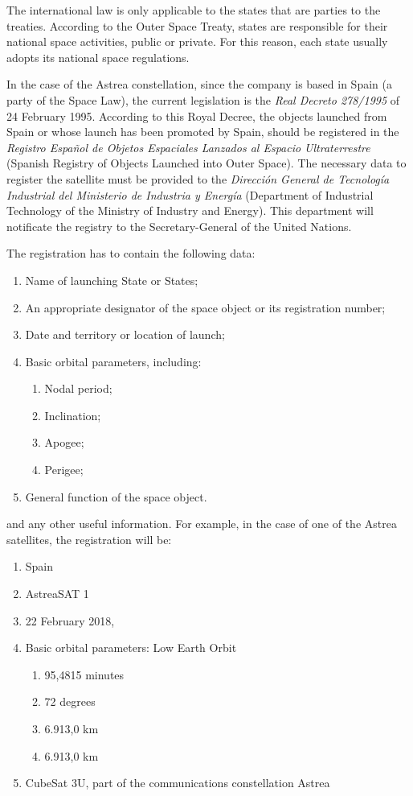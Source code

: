 The international law is only applicable to the states that are parties to the treaties. According to the Outer Space Treaty, states are responsible for their national space activities, public or private. For this reason, each state usually adopts its national space regulations.

In the case of the Astrea constellation, since the company is based in Spain (a party of the Space Law), the current legislation is the \textit{Real Decreto 278/1995} of 24 February 1995. According to this Royal Decree, the objects launched from Spain or whose launch has been promoted by Spain, should be registered in the \textit{Registro Español de Objetos Espaciales Lanzados al Espacio Ultraterrestre} (Spanish Registry of Objects Launched into Outer Space). The necessary data to register the satellite must be provided to the \textit{Dirección General de Tecnología Industrial del Ministerio de Industria y Energía} (Department of Industrial Technology of the Ministry of Industry and Energy). This department will notificate the registry to the Secretary-General of the United Nations.

The registration has to contain the following data:

\begin{enumerate}[label=\alph*)]
\item Name of launching State or States;
\item An appropriate designator of the space object or its registration number;
\item Date and territory or location of launch;
\item Basic orbital parameters, including:
\begin{enumerate}[label=\Roman*)]
\item Nodal period;
\item Inclination;
\item Apogee;
\item Perigee;
\end{enumerate}
\item General function of the space object.
\end{enumerate}

and any other useful information.
For example, in the case of one of the Astrea satellites, the registration will be:

\begin{enumerate}[label=\alph*)]
\item Spain
\item AstreaSAT 1
\item 22 February 2018, 
\item Basic orbital parameters: Low Earth Orbit
\begin{enumerate}[label=\Roman*)]
\item 95,4815 minutes
\item 72 degrees
\item 6.913,0 km
\item 6.913,0 km
\end{enumerate}
\item CubeSat 3U, part of the communications constellation Astrea
\end{enumerate}